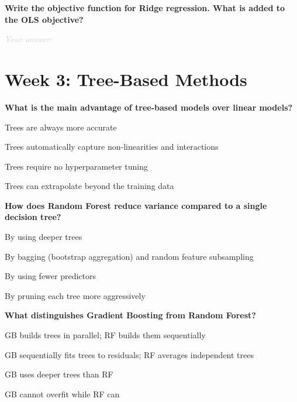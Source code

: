\documentclass[11pt]{article}
\newcommand{\shortanswer}{%
  \vspace{0.3em}
  \textcolor{LightGray}{\textit{Your answer:} \hrulefill}
  \vspace{0.5em}
}
\begin{document}
\begin{questions}[resume]
\item \textbf{Write the objective function for Ridge regression. What is added to the OLS objective?}

\shortanswer

\end{questions}

\newpage 
\section*{Week 3: Tree-Based Methods}

\begin{questions}[resume]

\item \textbf{What is the main advantage of tree-based models over linear models?}
\begin{options}
  \item Trees are always more accurate
  \item Trees automatically capture non-linearities and interactions
  \item Trees require no hyperparameter tuning
  \item Trees can extrapolate beyond the training data
\end{options}

\item \textbf{How does Random Forest reduce variance compared to a single decision tree?}
\begin{options}
  \item By using deeper trees
  \item By bagging (bootstrap aggregation) and random feature subsampling
  \item By using fewer predictors
  \item By pruning each tree more aggressively
\end{options}

\item \textbf{What distinguishes Gradient Boosting from Random Forest?}
\begin{options}
  \item GB builds trees in parallel; RF builds them sequentially
  \item GB sequentially fits trees to residuals; RF averages independent trees
  \item GB uses deeper trees than RF
  \item GB cannot overfit while RF can
\end{options}


\end{questions}
\end{document}
